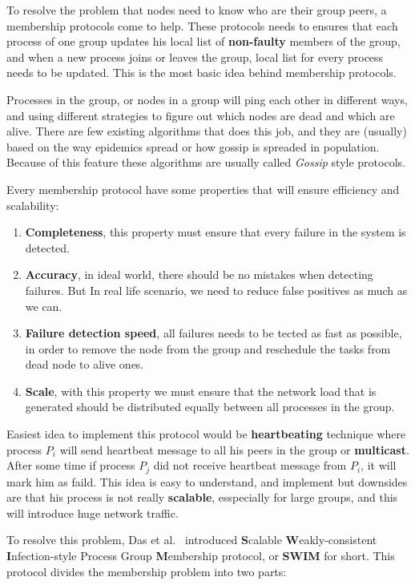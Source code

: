 To resolve the problem that nodes need to know who are their group peers, a membership protocols come to help. These protocols needs to ensures that each process of one group updates his local list of \textbf{non-faulty} members of the group, and when a new process joins or leaves the group, local list for every process needs to be updated. This is the most basic idea behind membership protocols.

Processes in the group, or nodes in a group will ping each other in different ways, and using different strategies to figure out which nodes are dead and which are alive. There are few existing algorithms that does this job, and they are (usually) based on the way epidemics spread or how gossip is spreaded in population. Because of this feature these algorithms are usually called \textit{Gossip} style protocols.

Every membership protocol have some properties that will ensure efficiency and scalability:

\begin{enumerate}[start=1,label={(\bfseries \arabic*)}]
	\item \textbf{Completeness}, this property must ensure that every failure in the system is detected.
	\item \textbf{Accuracy}, in ideal world, there should be no mistakes when detecting failures. But In real life scenario, we need to reduce false positives as much as we can.
	\item \textbf{Failure detection speed}, all failures needs to be tected as fast as possible, in order to remove the node from the group and reschedule the tasks from dead node to alive ones.
	\item \textbf{Scale}, with this property we must ensure that the network load that is generated should be distributed equally between all processes in the group.
\end{enumerate}

Easiest idea to implement this protocol would be \textbf{heartbeating} technique where process $P_i$ will send heartbeat message to all his peers in the group or \textbf{multicast}. After some time if process $P_j$ did not receive heartbeat message from $P_i$, it will mark him as faild. This idea is easy to understand, and implement but downsides are that his process is not really \textbf{scalable}, esspecially for large groups, and this will introduce huge network traffic.

To resolve this problem, Das et al.~\cite{DasGM02} introduced \textbf{S}calable \textbf{W}eakly-consistent \textbf{I}nfection-style Process Group \textbf{M}embership protocol, or \textbf{SWIM} for short. This protocol divides the membership problem into two parts:

